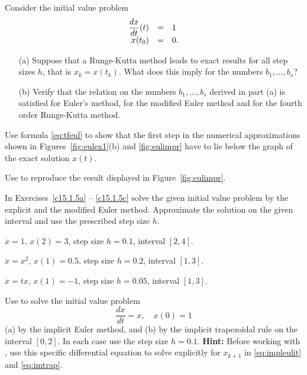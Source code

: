 \documentclass{ximera}
\begin{document}
\begin{exercise} \label{c15.1.4}
Consider the initial value problem
\[
\begin{array}{rcl}
\displaystyle\frac{dx}{dt}(t) & = & 1 \\
x(t_0) & = & 0.
\end{array}
\]
\begin{itemize}
\item[(a)] Suppose that a Runge-Kutta method leads to exact
results for all step sizes $h$, that is $x_k=x(t_k)$.  What 
does this imply for the numbers $b_1,\ldots,b_s$?
\item[(b)] Verify that the relation on the numbers $b_1,\ldots,b_s$
derived in part (a) is satisfied
for Euler's method, for the modified Euler method and for the
fourth order Runge-Kutta method.
\end{itemize}
\end{exercise}

\begin{exercise} \label{c15.1.4a}
Use formula \eqref{eq:tfeul} to show that the first step in
the numerical approximations shown in Figures~\ref{fig:eulex1}(b)
and \ref{fig:eulimpr} have to lie below the graph of
the exact solution $x(t)$.
\end{exercise}



\CEXER

\begin{exercise} \label{c15.1.6}
Use \Matlab to reproduce the result displayed in Figure~\ref{fig:eulimpr}.
\end{exercise}

\noindent In Exercises~\ref{c15.1.5a} -- \ref{c15.1.5c} solve
the given initial value problem by the explicit and the
modified Euler method.  Approximate the solution on the given interval
and use the prescribed step size $h$.
\begin{exercise} \label{c15.1.5a}
$\dot x = 1$, $x(2)=3$, step size $h=0.1$, interval $[2,4]$.
\end{exercise}
\begin{exercise} \label{c15.1.5b}
$\dot x = x^2$, $x(1)=0.5$, step size $h=0.2$, interval $[1,3]$.
\end{exercise}
\begin{exercise} \label{c15.1.5c}
$\dot x = tx$, $x(1)=-1$, step size $h=0.05$, interval $[1,3]$.
\end{exercise}

\begin{exercise} \label{c15.1.7}
Use \Matlab to solve the initial value problem
\[
\frac{dx}{dt} = x,\quad x(0)=1
\]
(a) by the implicit Euler method, and (b) by the implicit trapezoidal 
rule on the interval $[0,2]$.  In each case use the step size $h=0.1$.
{\bf Hint:} Before working with \Matlabp, use this specific differential
equation to solve explicitly for $x_{k+1}$ in \eqref{eq:impleulit} and 
\eqref{eq:imtrap}.
\end{exercise}
\end{document}
